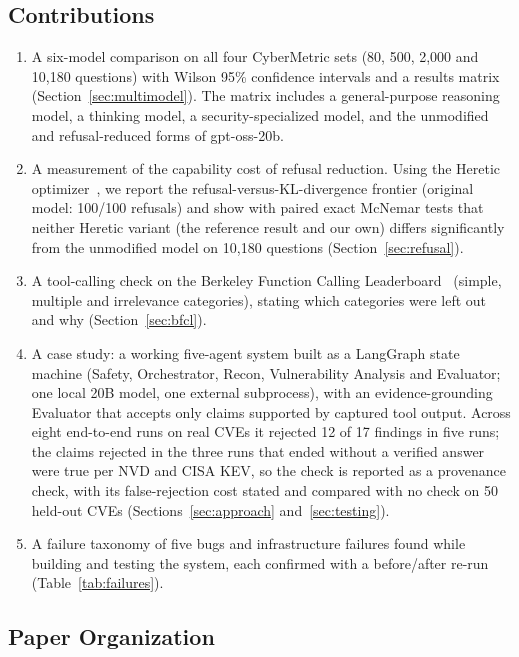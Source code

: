 \documentclass[conference]{IEEEtran}
\begin{document}
\subsection{Contributions}

\begin{enumerate}
\item A six-model comparison on all four CyberMetric sets (80, 500, 2{,}000
  and 10{,}180 questions) with Wilson 95\% confidence intervals and a
  results matrix (Section~\ref{sec:multimodel}). The matrix includes a
  general-purpose reasoning model, a thinking model, a security-specialized
  model, and the unmodified and refusal-reduced forms of gpt-oss-20b.
\item A measurement of the capability cost of refusal reduction. Using the
  Heretic optimizer~\cite{heretic}, we report the refusal-versus-KL-divergence
  frontier (original model: 100/100 refusals) and show with paired exact
  McNemar tests that neither Heretic variant (the reference result and our own)
  differs significantly from the unmodified model on 10{,}180
  questions (Section~\ref{sec:refusal}).
\item A tool-calling check on the Berkeley Function Calling
  Leaderboard~\cite{bfcl} (simple, multiple and irrelevance categories),
  stating which categories were left out and why
  (Section~\ref{sec:bfcl}).
\item A case study: a working five-agent system built as a LangGraph state machine
  (Safety, Orchestrator, Recon, Vulnerability Analysis and Evaluator; one
  local 20B model, one external subprocess), with an evidence-grounding
  Evaluator that accepts only claims supported by captured tool output.
  Across eight end-to-end runs on real CVEs it rejected 12 of 17 findings
  in five runs; the claims rejected in the three runs that ended without
  a verified answer were true per NVD and CISA KEV, so the check is
  reported as a provenance check, with its false-rejection cost stated and compared with no check on 50 held-out CVEs
  (Sections~\ref{sec:approach} and~\ref{sec:testing}).
\item A failure taxonomy of five bugs and infrastructure failures found
  while building and testing the system, each confirmed with a
  before/after re-run (Table~\ref{tab:failures}).
\end{enumerate}

\subsection{Paper Organization}
\end{document}
